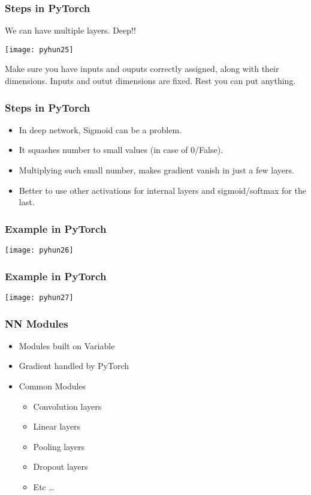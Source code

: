 \begin{frame}[fragile] \frametitle{Steps in PyTorch}
We can have multiple layers. Deep!!

\begin{center}
\texttt{[image: pyhun25]}
\end{center}

Make sure you have inputs and ouputs correctly assigned, along with their dimensions.
Inputs and outut dimensions are fixed. Rest you can put anything.
\end{frame}



\begin{frame}[fragile] \frametitle{Steps in PyTorch}
\begin{itemize}
\item In deep network, Sigmoid can be a problem. 
\item It squashes number to small values (in case of 0/False). 
\item Multiplying such small number, makes gradient vanish in just a few layers.
\item Better to use other activations for internal layers and sigmoid/softmax for the last.
\end{itemize}
\end{frame}


\begin{frame}[fragile] \frametitle{Example in PyTorch}
\begin{center}
\texttt{[image: pyhun26]}
\end{center}
\end{frame}


\begin{frame}[fragile] \frametitle{Example in PyTorch}
\begin{center}
\texttt{[image: pyhun27]}
\end{center}
\end{frame}


\begin{frame}[fragile] \frametitle{ NN Modules}
\begin{itemize}
\item Modules built on Variable
\item Gradient handled by PyTorch
\item Common Modules
\begin{itemize}
\item  Convolution layers
\item  Linear layers
\item  Pooling layers
\item  Dropout layers
\item  Etc \ldots
\end{itemize}
\end{itemize}
\end{frame}

